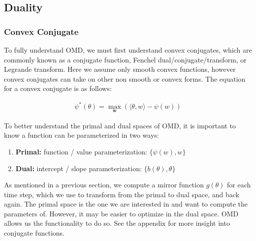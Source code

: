 \documentclass[11pt]{article}
\begin{document}
\subsection{Duality}
\label{sec:duality}

\subsubsection{Convex Conjugate}
To fully understand OMD, we must first understand convex conjugates, which are commonly known as a conjugate function, Fenchel dual/conjugate/transform, or Legrande transform. Here we assume only smooth convex functions, however convex conjugates can take on other non smooth or convex forms. The equation for a convex conjugate is as follows:


\begin{align}
\label{eq:8}
    \psi^*(\theta) = \max\limits_{\textbf{w}} (\langle \theta, w \rangle - \psi(w))
\end{align}

To better understand the primal and dual spaces of OMD, it is important to know a function can be parameterized in two ways:

\begin{enumerate}
    \item \textbf{Primal:} function / value parameterization:
    $\{\psi(w), w\}$
    \item \textbf{Dual:} intercept / slope parameterization: 
    $\{b(\theta), \theta\}$
\end{enumerate}


As mentioned in a previous section, we compute a mirror function $g(\theta)$ for each time step, which we use to transform from the primal to dual space, and back again. The primal space is the one we are interested in and want to compute the parameters of. However, it may be easier to optimize in the dual space. OMD allows us the functionality to do so. See the appendix for more insight into conjugate functions.
\end{document}

